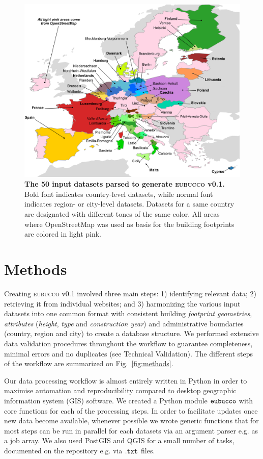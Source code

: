 \documentclass[fleqn,10pt]{wlscirep}
\begin{document}
\begin{figure}[h!]
\centering
\includegraphics[width=\linewidth]{figs/intro_fig.png}
\caption{\textbf{The 50 input datasets parsed to generate \textsc{eubucco} v0.1.} Bold font indicates country-level datasets, while normal font indicates region- or city-level datasets. Datasets for a same country are designated with different tones of the same color. All areas where OpenStreetMap was used as basis for the building footprints are colored in light pink.}
\label{fig:intro_fig}
\end{figure}


\section*{Methods}

Creating \textsc{eubucco} v0.1 involved three main steps: 1) identifying relevant data; 2) retrieving it from individual websites; and 3) harmonizing the various input datasets into one common format with consistent building \textit{footprint geometries}, \textit{attributes} (\textit{height}, \textit{type} and \textit{construction year}) and administrative boundaries (country, region and city) to create a database structure. We performed extensive data validation procedures throughout the workflow to guarantee completeness, minimal errors and no duplicates (see Technical Validation). The different steps of the workflow are summarized on Fig.~\ref{fig:methods}. 

Our data processing workflow\cite{eubucco-0.1-code2022} is almost entirely written in Python in order to maximise automation and reproducibility compared to desktop geographic information system (GIS) software. We created a Python module ${\tt eubucco}$ with core functions for each of the processing steps. In order to facilitate updates once new data become available, whenever possible we wrote generic functions that for most steps can be run in parallel for each datasets via an argument parser e.g. as a job array. We also used PostGIS and QGIS for a small number of tasks, documented on the repository e.g. via ${\tt.txt}$ files.  
\end{document}
